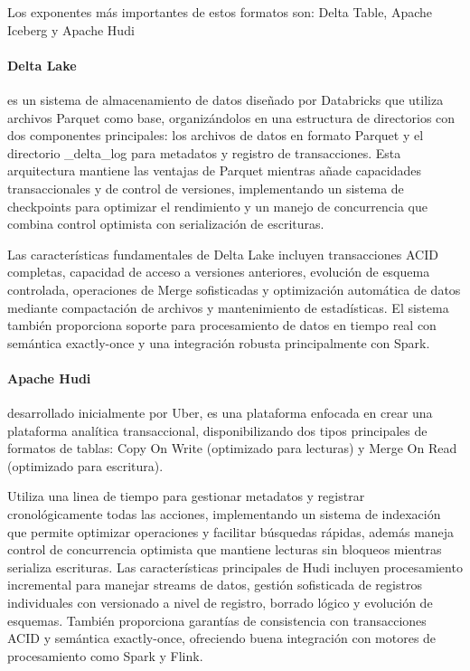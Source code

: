 Los exponentes más importantes de estos formatos son: Delta Table, Apache Iceberg y Apache Hudi

\paragraph{Delta Lake}es un sistema de almacenamiento de datos diseñado por Databricks que utiliza archivos Parquet como base, 
organizándolos en una estructura de directorios con dos componentes principales: 
los archivos de datos en formato Parquet y el directorio {\_delta\_log} para metadatos y registro de transacciones. 
Esta arquitectura mantiene las ventajas de Parquet mientras añade capacidades transaccionales y de control de versiones, 
implementando un sistema de checkpoints para optimizar el rendimiento y un manejo de concurrencia que combina control optimista 
con serialización de escrituras.

Las características fundamentales de Delta Lake incluyen transacciones ACID completas, 
capacidad de acceso a versiones anteriores, evolución de esquema controlada, 
operaciones de Merge sofisticadas y optimización automática de datos mediante compactación de archivos y mantenimiento de estadísticas. 
El sistema también proporciona soporte para procesamiento de datos en tiempo real con semántica exactly-once 
y una integración robusta principalmente con Spark.

\paragraph{Apache Hudi}desarrollado inicialmente por Uber, es una plataforma enfocada en crear una plataforma analítica transaccional,
disponibilizando dos tipos principales de formatos de tablas: 
Copy On Write (optimizado para lecturas) y Merge On Read (optimizado para escritura). 

Utiliza una linea de tiempo para gestionar metadatos y registrar cronológicamente todas las acciones, 
implementando un sistema de indexación que permite optimizar operaciones y facilitar búsquedas rápidas, 
además maneja control de concurrencia optimista que mantiene lecturas sin bloqueos mientras serializa escrituras.
Las características principales de Hudi incluyen procesamiento incremental para manejar streams de datos, 
gestión sofisticada de registros individuales con versionado a nivel de registro, borrado lógico y evolución de esquemas.
También proporciona garantías de consistencia con transacciones ACID y semántica exactly-once, 
ofreciendo buena integración con motores de procesamiento como Spark y Flink.


